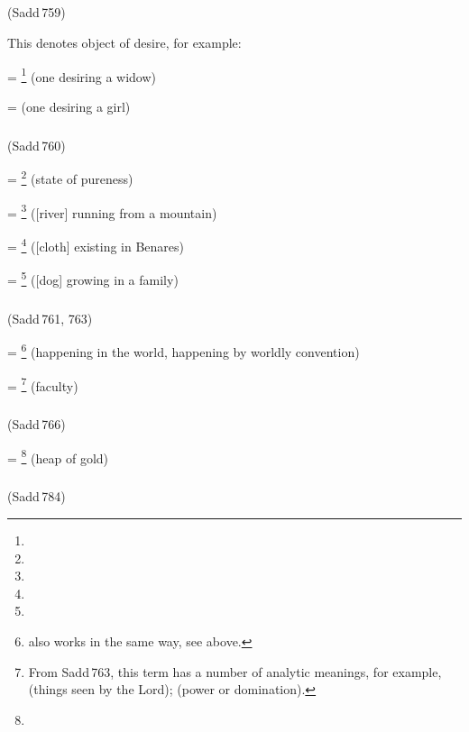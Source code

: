 \subparagraph*{} (Sadd\,759)\label{pacct2:dnera}

This denotes object of desire, for example:

 = \footnote{} (one desiring a widow) \par
{} =  (one desiring a girl) \par

\subparagraph*{} (Sadd\,760)\label{pacct2:S-dneyya}

 = \footnote{} (state of pureness) \par
{} = \footnote{} ([river] running from a mountain) \par
{} = \footnote{} ([cloth] existing in Benares) \par
{} = \footnote{} ([dog] growing in a family) \par

\subparagraph*{} (Sadd\,761, 763)\label{pacct2:dniya}

 = \footnote{  also works in the same way, see  above.} (happening in the world, happening by worldly convention) \par
{} = \footnote{From Sadd\,763, this term has a number of analytic meanings, for example,  (things seen by the Lord);  (power or domination).} (faculty) \par

\subparagraph*{} (Sadd\,766)\label{pacct2:dnaya}

 = \footnote{} (heap of gold) \par

\subparagraph*{} (Sadd\,784)\label{pacct2:ii}


